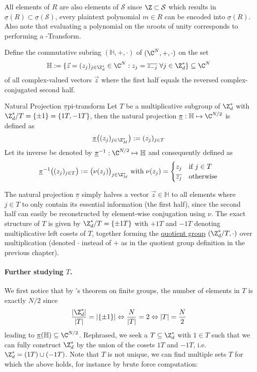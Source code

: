 All elements of $R$ are also elements of $\mathcal{S}$ since $\Z \subset \mathcal{S}$ which results in $\underline{\sigma}(R) \subset \underline{\sigma}(\mathcal{S})$, every plaintext polynomial $m \in R$ can be encoded into $\underline{\sigma}(R)$.
Also note that evaluating a polynomial on the $n$\th roots of unity corresponds to performing a -Transform.

Define the commutative subring $(\mathbb{H}, +, \cdot)$ of $(\C^N, +, \cdot)$ on the set
$$\mathbb{H} := \{\vec{z} = (z_j)_{j \in \Z_d^*} \in \C^N : z_j = \overline{z_{-j}} \;\forall j \in \Z_d^*\} \subseteq \C^N$$
of all complex-valued vectors $\vec{z}$ where the first half equals the reversed complex-conjugated second half.

\begin{definition}{Natural Projection $\underline{\pi}$}{pi-transform}
  Let $T$ be a multiplicative subgroup of $\Z_d^*$ with $\Z_d^* / T = \{\pm 1\} = \{1T, -1T\}$, then the natural projection $\underline{\pi}: \mathbb{H} \mapsto \C^{N/2}$ is defined as
  $$\underline{\pi}\big((z_j)_{j \in \Z_M^*}\big) := (z_j)_{j \in T}$$
  Let its inverse be denoted by $\underline{\pi}\inv: \C^{N/2} \mapsto \mathbb{H}$ and consequently defined as
  $$\underline{\pi}\inv\big((z_j)_{j \in T}\big) := \big(\nu(z_j)\big)_{j \in \Z_M^*} \; \mathrm{with} \; \nu(z_j) = \begin{cases}
      z_j            & \text{if } j \in T \\
      \overline{z_j} & \text{otherwise}
    \end{cases}$$
\end{definition}

The natural projection $\underline{\pi}$ simply halves a vector $\vec{z} \in \mathbb{H}$ to all elements where $j \in T$ to only contain its essential information (the first half), since the second half can easily be reconstructed by element-wise conjugation using $\nu$.
The exact structure of $T$ is given by $\Z_d^* / T = \{\pm 1T\}$ with $+1T$ and $-1T$ denoting multiplicative left cosets of $T$, together forming the \hyperref[def:quotient-group]{quotient group} $(\Z_d^* / T, \cdot)$ over multiplication (denoted $\cdot$ instead of $+$ as in the quotient group definition in the previous chapter).

\paragraph{Further studying $T$.}
We first notice that by 's theorem on finite groups, the number of elements in $T$ is exactly $N / 2$ since $$\frac{|\Z_d^*|}{|T|} = |\{\pm 1\}| \Leftrightarrow \frac{N}{|T|} = 2 \Leftrightarrow |T| = \frac{N}{2}$$ leading to $\underline{\pi}(\mathbb{H}) \subseteq \C^{N/2}$.
Rephrased, we seek a $T \subseteq \Z_d^*$ with $1 \in T$ such that we can fully construct $\Z_d^*$ by the union of the cosets $1T$ and $-1T$, i.e. $\Z_d^* = (1T) \cup (-1T)$.
Note that $T$ is not unique, we can find multiple sets $T$ for which the above holds, for instance by brute force computation:

